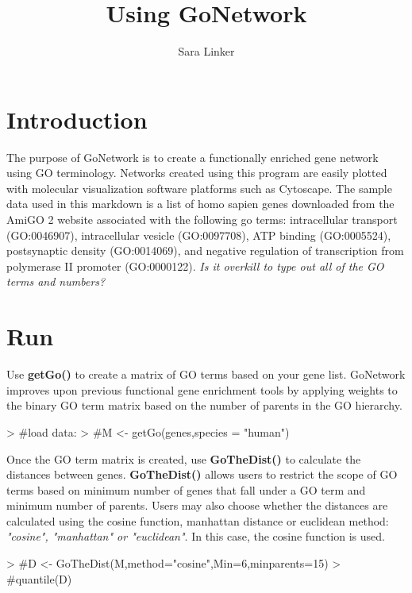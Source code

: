 \documentclass{article}
\title{Using GoNetwork}
\author{Sara Linker}
\begin{document}
\maketitle


\section*{Introduction}
  The purpose of GoNetwork is to create a functionally enriched gene network using GO terminology. Networks created using this program are easily plotted with molecular visualization software platforms such as Cytoscape.  The sample data used in this markdown is a list of homo sapien genes downloaded from the AmiGO 2 website associated with the following go terms: intracellular transport (GO:0046907), intracellular vesicle (GO:0097708), ATP binding (GO:0005524), postsynaptic density (GO:0014069), and negative regulation of transcription from polymerase II promoter (GO:0000122). \textit{Is it overkill to type out all of the GO terms and numbers?}







\section*{Run}
Use \textbf{getGo()} to create a matrix of GO terms based on your gene list.  GoNetwork improves upon previous functional gene enrichment tools by applying weights to the binary GO term matrix based on the number of parents in the GO hierarchy.
\begin{Schunk}
\begin{Sinput}
> #load data:
> #M <- getGo(genes,species = "human")
\end{Sinput}
\end{Schunk}


Once the GO term matrix is created, use \textbf{GoTheDist()} to calculate the distances between genes. \textbf{GoTheDist()} allows users to restrict the scope of GO terms based on minimum number of genes that fall under a GO term and minimum number of parents. Users may also choose whether the distances are calculated using the cosine function, manhattan distance or euclidean method: \textit{"cosine", "manhattan" or "euclidean"}.  In this case, the cosine function is used.

\vspace{5mm}
\begin{Schunk}
\begin{Sinput}
> #D <- GoTheDist(M,method="cosine",Min=6,minparents=15)
> #quantile(D)
\end{Sinput}
\end{Schunk}
\end{document}
